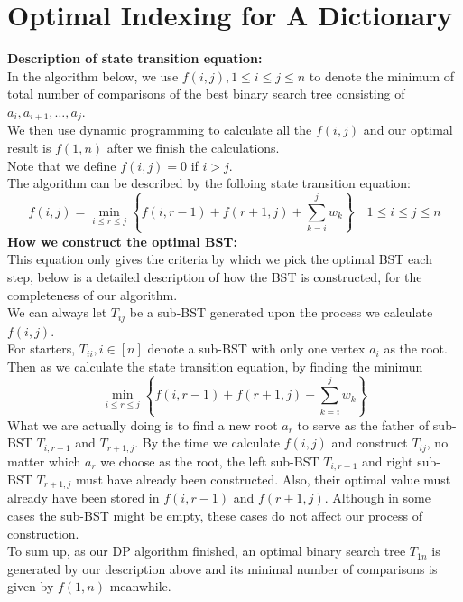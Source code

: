 \documentclass[12pt,letterpaper]{article}
\begin{document}
\section{Optimal Indexing for A Dictionary}
\textbf{Description of state transition equation:}\\
In the algorithm below,
we use $f(i,j),1\leq i\leq j\leq n$ to denote the minimum of total number of comparisons
of the best binary search tree consisting of $a_i,a_{i+1},\dots,a_j$.\\
We then use dynamic programming to calculate all the $f(i,j)$
and our optimal result is $f(1,n)$ after we finish the calculations.\\
Note that we define $f(i,j)=0$ if $i>j$.\\
The algorithm can be described by the folloing state transition equation:\\
$$f(i,j)=\min_{i\leq r\leq j}\left\{f(i,r-1)+f(r+1,j)+\sum_{k=i}^{j}w_k\right\} \quad 1\leq i\leq j\leq n$$
\newline
\newline
\textbf{How we construct the optimal BST:}\\
This equation only gives the criteria by which we pick the optimal BST each step,
below is a detailed description of how the BST is constructed,
for the completeness of our algorithm.\\
We can always let $T_{ij}$ be a sub-BST generated upon the process we calculate $f(i,j)$.\\
\newline
For starters, $T_{ii},i\in[n]$ denote a sub-BST with only one vertex $a_i$ as the root.\\
Then as we calculate the state transition equation,
by finding the minimun 
$$\min_{i\leq r\leq j}\left\{f(i,r-1)+f(r+1,j)+\sum_{k=i}^{j}w_k\right\}$$
What we are actually doing is to find a new root $a_r$ 
to serve as the father of sub-BST $T_{i,r-1}$ and $T_{r+1,j}$.
By the time we calculate $f(i,j)$ and construct $T_{ij}$,
no matter which $a_r$ we choose as the root, 
the left sub-BST $T_{i,r-1}$ and right sub-BST $T_{r+1,j}$
must have already been constructed.
Also, their optimal value must already have been stored in $f(i,r-1)$ and $f(r+1,j)$.
Although in some cases the sub-BST might be empty, 
these cases do not affect our process of construction.\\
To sum up,
as our DP algorithm finished,
an optimal binary search tree $T_{1n}$ is generated by our description above 
and its minimal number of comparisons is given by $f(1,n)$ meanwhile.
\end{document}
